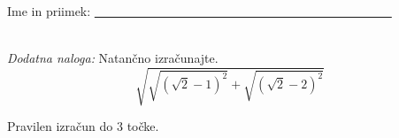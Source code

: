 \documentclass[addpoints]{exam}
\begin{document}
\begin{questions}






     \newpage

     \noindent Ime in priimek: \underline{~~~~~~~~~~~~~~~~~~~~~~~~~~~~~~~~~~~~~~~~~~~~~~~~}

     ~\\






        

    \bonusquestion[3]
    \textit{Dodatna naloga:} Natančno izračunajte. $$ \sqrt{\sqrt{\left(\sqrt{2}-1\right)^2}+\sqrt{\left(\sqrt{2}-2\right)^2}} $$

    \begin{solution}[7cm]
        Pravilen izračun do $3$ točke.
    \end{solution}




\end{questions}
\end{document}
